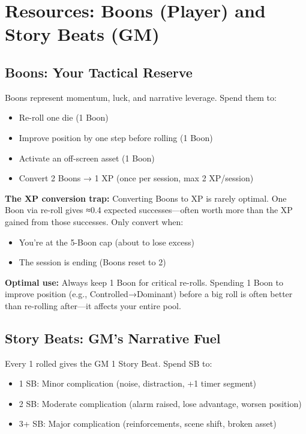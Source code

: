 \documentclass[11pt]{article}
\begin{document}
\section{Resources: Boons (Player) and Story Beats (GM)}

\subsection{Boons: Your Tactical Reserve}
Boons represent momentum, luck, and narrative leverage. Spend them to:
\begin{itemize}
    \item Re-roll one die (1 Boon)
    \item Improve position by one step before rolling (1 Boon)
    \item Activate an off-screen asset (1 Boon)
    \item Convert 2 Boons → 1 XP (once per session, max 2 XP/session)
\end{itemize}

\textbf{The XP conversion trap:} Converting Boons to XP is rarely optimal. One Boon via re-roll gives ≈0.4 expected successes—often worth more than the XP gained from those successes. Only convert when:
\begin{itemize}
    \item You're at the 5-Boon cap (about to lose excess)
    \item The session is ending (Boons reset to 2)
\end{itemize}

\textbf{Optimal use:} Always keep 1 Boon for critical re-rolls. Spending 1 Boon to improve position (e.g., Controlled→Dominant) before a big roll is often better than re-rolling after—it affects your entire pool.

\subsection{Story Beats: GM's Narrative Fuel}
Every 1 rolled gives the GM 1 Story Beat. Spend SB to:
\begin{itemize}
    \item 1 SB: Minor complication (noise, distraction, +1 timer segment)
    \item 2 SB: Moderate complication (alarm raised, lose advantage, worsen position)
    \item 3+ SB: Major complication (reinforcements, scene shift, broken asset)
\end{itemize}
\end{document}
